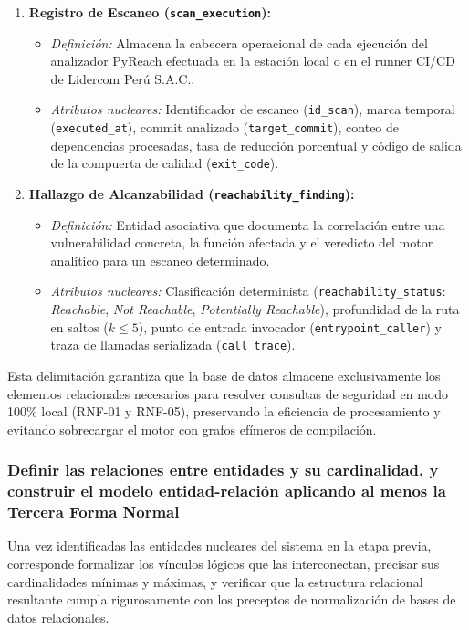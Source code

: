 \begin{enumerate}
    \item \textbf{Registro de Escaneo (\texttt{scan\_\allowbreak execution}):}
    \begin{itemize}
        \item \textit{Definición:} Almacena la cabecera operacional de cada ejecución del analizador PyReach efectuada en la estación local o en el runner CI/CD de Lidercom Perú S.A.C..
        \item \textit{Atributos nucleares:} Identificador de escaneo (\texttt{id\_\allowbreak scan}), marca temporal (\texttt{executed\_\allowbreak at}), commit analizado (\texttt{target\_\allowbreak commit}), conteo de dependencias procesadas, tasa de reducción porcentual y código de salida de la compuerta de calidad (\texttt{exit\_\allowbreak code}).
    \end{itemize}

    \item \textbf{Hallazgo de Alcanzabilidad (\texttt{reachability\_\allowbreak finding}):}
    \begin{itemize}
        \item \textit{Definición:} Entidad asociativa que documenta la correlación entre una vulnerabilidad concreta, la función afectada y el veredicto del motor analítico para un escaneo determinado.
        \item \textit{Atributos nucleares:} Clasificación determinista (\texttt{reachability\_\allowbreak status}: \textit{Reachable}, \textit{Not Reachable}, \textit{Potentially Reachable}), profundidad de la ruta en saltos ($k\le 5$), punto de entrada invocador (\texttt{entrypoint\_\allowbreak caller}) y traza de llamadas serializada (\texttt{call\_\allowbreak trace}).
    \end{itemize}
\end{enumerate}

Esta delimitación garantiza que la base de datos almacene exclusivamente los elementos relacionales necesarios para resolver consultas de seguridad en modo 100\% local (RNF-01 y RNF-05), preservando la eficiencia de procesamiento y evitando sobrecargar el motor con grafos efímeros de compilación.

\subsubsection{Definir las relaciones entre entidades y su cardinalidad, y construir el modelo entidad-relación aplicando al menos la Tercera Forma Normal}

Una vez identificadas las entidades nucleares del sistema en la etapa previa, corresponde formalizar los vínculos lógicos que las interconectan, precisar sus cardinalidades mínimas y máximas, y verificar que la estructura relacional resultante cumpla rigurosamente con los preceptos de normalización de bases de datos relacionales. 

